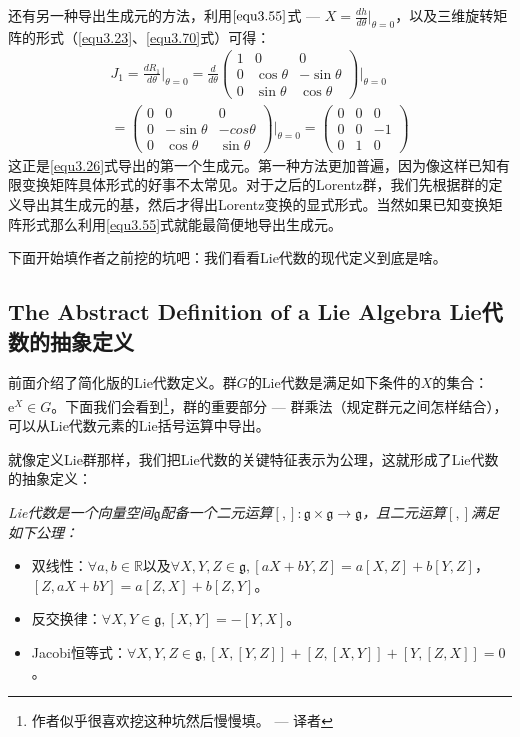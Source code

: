 还有另一种导出生成元的方法，利用$\ref{equ3.55}$式 --- $X = \frac{dh}{d\theta}\big|_{\theta = 0}$，以及三维旋转矩阵的形式（\ref{equ3.23}、\ref{equ3.70}式）可得：
\begin{multline}
\label{equ3.74}
J_1 = \frac{dR_1}{d\theta} \bigg|_{\theta = 0} = \frac{d}{d\theta}
	\begin{pmatrix}
		1 & 0 & 0 \\
		0 & \cos \theta & -\sin \theta \\
		0 & \sin \theta & \cos \theta
	\end{pmatrix}
\Bigg|_{\theta = 0} \\
= 	\begin{pmatrix}
		0 & 0 & 0 \\
		0 & -\sin \theta & -cos \theta \\
		0 & \cos \theta & \sin \theta
	\end{pmatrix}
\Bigg|_{\theta = 0}
=	\begin{pmatrix}
		0 & 0 & 0 \\
		0 & 0 & -1 \\
		0 & 1 & 0
	\end{pmatrix}
\end{multline}
这正是\ref{equ3.26}式导出的第一个生成元。第一种方法更加普遍，因为像这样已知有限变换矩阵具体形式的好事不太常见。对于之后的Lorentz群，我们先根据群的定义导出其生成元的基，然后才得出Lorentz变换的显式形式。当然如果已知变换矩阵形式那么利用\ref{equ3.55}式就能最简便地导出生成元。

下面开始填作者之前挖的坑吧：我们看看Lie代数的现代定义到底是啥。

\subsection[Lie代数的抽象定义]{The Abstract Definition of a Lie Algebra \quad Lie代数的抽象定义}
\label{sec3.4.2}
前面介绍了简化版的Lie代数定义。群$G$的Lie代数是满足如下条件的$X$的集合：$\mathrm{e}^{X} \in G$。下面我们会看到\footnote{作者似乎很喜欢挖这种坑然后慢慢填。 --- 译者}，群的重要部分 --- 群乘法（规定群元之间怎样结合），可以从Lie代数元素的Lie括号运算中导出。

就像定义Lie群那样，我们把Lie代数的关键特征表示为公理，这就形成了Lie代数的抽象定义：

{\it
Lie代数是一个向量空间$\mathfrak{g}$配备一个二元运算$[,]: \mathfrak{g} \times \mathfrak{g} \rightarrow \mathfrak{g}$，且二元运算$[,]$满足如下公理：
\begin{itemize}
	\item 双线性：$\forall a, b \in \mathbb{R} \text{以及} \forall X, Y, Z \in \mathfrak{g}, [aX + bY, Z] = a[X, Z] + b[Y, Z]$，$[Z, aX + bY] = a[Z, X] + b[Z, Y]$。
	\item 反交换律：$\forall X, Y \in \mathfrak{g}, [X, Y] = -[Y, X]$。
	\item Jacobi恒等式：$\forall X, Y, Z \in \mathfrak{g}, [X, [Y, Z]] + [Z, [X, Y]] + [Y, [Z, X]] = 0$。
\end{itemize}
}

